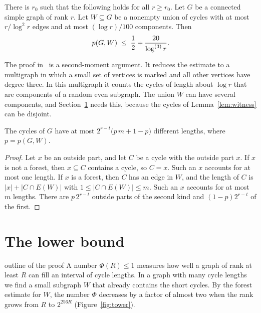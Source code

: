 \documentclass[11pt]{article}
\begin{document}
\begin{theorem}\label{thm:forest}
There is $r_0$ such that the following holds for all $r\ge r_0$. Let $G$ be a connected simple graph
of rank $r$. Let $W\subseteq G$ be a nonempty union of cycles with at most $r/\log^{2}r$ edges and
at most $(\log r)/100$ components. Then
\[
  p(G,W)\;\le\;\frac12+\frac{20}{\log^{(3)}r}.
\]
\end{theorem}

The proof in~\cite{Forest} is a second-moment argument. It reduces the estimate to a multigraph
in which a small set of vertices is marked and all other vertices have degree three. In this
multigraph it counts the cycles of length about $\log r$ that are components of a random even
subgraph. The union $W$ can have several components, and Section~\ref{sec:lower} needs this,
because the cycles of Lemma~\ref{lem:witness} can be disjoint.

\begin{lemma}[Lengths]\label{lem:count}
The cycles of $G$ have at most $2^{r-t}\bigl(p\,m+1-p\bigr)$ different lengths, where $p=p(G,W)$.
\end{lemma}

\begin{proof}
Let $x$ be an outside part, and let $C$ be a cycle with the outside part $x$. If $x$ is not a
forest, then $x\subseteq C$ contains a cycle, so $C=x$. Such an $x$ accounts for at most one
length. If $x$ is a forest, then $C$ has an edge in $W$, and the length of $C$ is
$|x|+|C\cap E(W)|$ with $1\le|C\cap E(W)|\le m$. Such an $x$ accounts for at most $m$ lengths.
There are $p\,2^{r-t}$ outside parts of the second kind and $(1-p)2^{r-t}$ of the first.
\end{proof}

\section{The lower bound}\label{sec:lower}

\begin{idea}{outline of the proof}
A number $\Phi(R)\le1$ measures how well a graph of rank at least $R$ can fill an interval of cycle
lengths. In a graph with many cycle lengths we find a small subgraph $W$ that already contains the
short cycles. By the forest estimate for $W$, the number $\Phi$ decreases by a factor of almost
two when the rank grows from $R$ to $2^{256R}$ (Figure~\ref{fig:tower}).
\end{idea}
\end{document}
